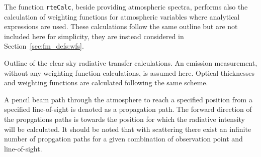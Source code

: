 The function \verb|rteCalc|, beside providing atmospheric spectra,
performs also the calculation of weighting functions for atmospheric
variables where analytical expressions are used. These calculations
follow the same outline but are not included here for simplicity, they
are instead considered in Section~\ref{sec:fm_defs:wfs}. 

\begin{algorithm}
 \begin{algorithmic}
  \ENDIF
     \ENDIF
    \ENDFOR
   \ENDFOR
  \ENDFOR
 \end{algorithmic}
 \caption{Outline of the clear sky radiative transfer calculations. An emission
   measurement, without any weighting function calculations, is
   assumed here. Optical thicknesses and weighting functions are
   calculated following the same scheme.}
 \label{alg:fm_defs:rteCalc}
\end{algorithm}


\label{sec:fm_defs:ppaths}

A pencil beam path through the atmosphere to reach a specified
position from a specified line-of-sight is denoted as a propagation
path. The forward direction of the propgations paths is towards the
position for which the radiative intensity will be calculated. It
should be noted that with scattering there exist an infinite number
of propgation paths for a given combination of observation point and
line-of-sight. 

